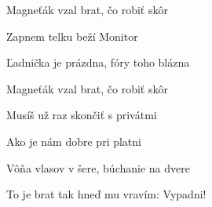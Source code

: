 \begin{song}
\bigskip

Magneťák vzal brat, čo robiť skôr \par
{}Zapnem telku beží Monitor \par
{}Ľadnička je prázdna, fóry toho blázna \par
{}Magneťák vzal brat, čo robiť skôr \par

\bigskip

Musíš už raz skončiť s privátmi \par
{}Ako je nám dobre pri platni \par
{}Vôňa vlasov v šere, búchanie na dvere \par
{}To je brat tak hneď mu vravím: Vypadni! \par

\bigskip

\Refren

\end{song}
